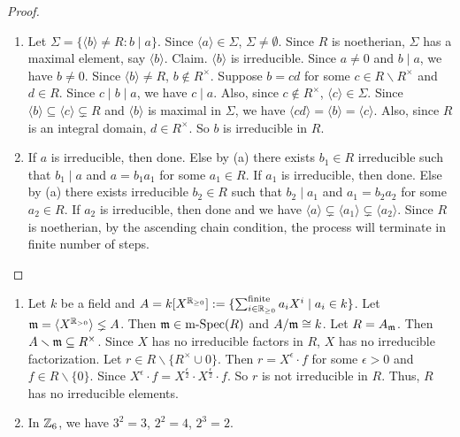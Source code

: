 \begin{proof}
    \begin{enumerate}
        \item Let $\Sigma = \{\langle b \rangle \neq R : b \mid a\}$. Since $\langle a \rangle \in \Sigma$, $\Sigma \neq \emptyset$. Since $R$ is noetherian, $\Sigma$ has a maximal element, say $\langle b \rangle$. Claim. $\langle b \rangle$ is irreducible. Since $a \neq 0$ and $b \mid a$, we have $b \neq 0$. Since $\langle b \rangle \neq R$, $b \not \in R^{\times}$. Suppose $b = cd$ for some $c \in R \smallsetminus R^{\times}$ and $d \in R$. Since $c \mid b \mid a$, we have $c \mid a$. Also, since $c \not \in R^{\times}$, $\langle c \rangle \in \Sigma$. Since $\langle b \rangle \subseteq \langle c \rangle \subsetneq R$ and $\langle b \rangle$ is maximal in $\Sigma$, we have $\langle cd \rangle = \langle b \rangle = \langle c \rangle$. Also, since $R$ is an integral domain, $d \in R^{\times}$. So $b$ is irreducible in $R$.
        \item If $a$ is irreducible, then done. Else by (a) there exists $b_1 \in R$ irreducible such that $b_1 \mid a$ and $a = b_1a_1$ for some $a_1 \in R$. If $a_1$ is irreducible, then done. Else by (a) there exists irreducible $b_2 \in R$ such that $b_2 \mid a_1$ and $a_1 = b_2a_2$ for some $a_2 \in R$. If $a_2$ is irreducible, then done and we have $\langle a \rangle \subsetneq \langle a_1 \rangle \subsetneq \langle a_2 \rangle$. Since $R$ is noetherian, by the ascending chain condition, the process will terminate in finite number of steps. \qedhere
    \end{enumerate}
\end{proof}

\begin{example}
    \begin{enumerate}
        \item 
            Let $k$ be a field and $A = k[X^{\mathbb{R}_{\geq 0}}] := \{\sum_{i \in \mathbb{R}_{\geq 0}}^{\text{finite}}a_iX^{i} \mid a_i \in k\}$. Let $\mathfrak{m} = \langle X^{\mathbb{R}_{>0}} \rangle \lneq A$. Then $\mathfrak{m} \in \operatorname{m-Spec}(R)$ and $A/\mathfrak{m} \cong k$. Let $R = A_{\mathfrak{m}}$. Then $A \smallsetminus \mathfrak{m} \subseteq R^{\times}$. Since $X$ has no irreducible factors in $R$, $X$ has no irreducible factorization. Let $r \in R \smallsetminus \{R^{\times} \cup 0\}$. Then $r = X^{\epsilon} \cdot f$ for some $\epsilon > 0$ and $f \in R \smallsetminus \{0\}$. Since $X^{\epsilon} \cdot f = X^{\frac{\epsilon}{2}} \cdot X^{\frac{\epsilon}{2}} \cdot f$. So $r$ is not irreducible in $R$. Thus, $R$ has no irreducible elements.
        \item 
            In $\mathbb{Z}_6$, we have $3^{2} = 3$, $2^{2} = 4$, $2^{3} = 2$.
    \end{enumerate}
\end{example}

